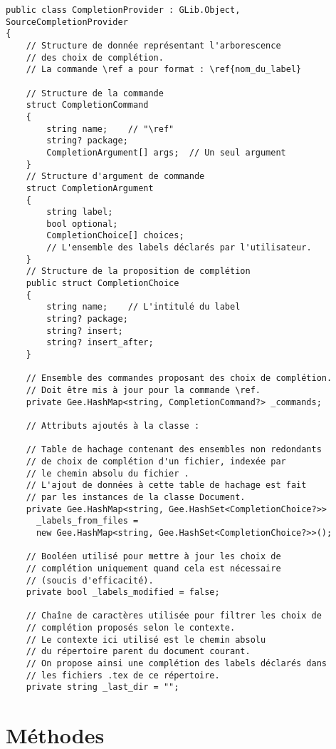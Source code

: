\documentclass[a4paper,11pt]{report}
\begin{document}
\begin{lstlisting}[frame=single]
public class CompletionProvider : GLib.Object, SourceCompletionProvider
{
    // Structure de donnée représentant l'arborescence
    // des choix de complétion.
    // La commande \ref a pour format : \ref{nom_du_label}
    
    // Structure de la commande
    struct CompletionCommand
    {
        string name;    // "\ref"
        string? package;
        CompletionArgument[] args;  // Un seul argument
    }
    // Structure d'argument de commande
    struct CompletionArgument
    {
        string label;
        bool optional;
        CompletionChoice[] choices;
        // L'ensemble des labels déclarés par l'utilisateur.
    }
    // Structure de la proposition de complétion
    public struct CompletionChoice
    {
        string name;    // L'intitulé du label
        string? package;
        string? insert;
        string? insert_after;
    }
    
    // Ensemble des commandes proposant des choix de complétion.
    // Doit être mis à jour pour la commande \ref.
    private Gee.HashMap<string, CompletionCommand?> _commands;
    
    // Attributs ajoutés à la classe :
    
    // Table de hachage contenant des ensembles non redondants
    // de choix de complétion d'un fichier, indexée par
    // le chemin absolu du fichier .
    // L'ajout de données à cette table de hachage est fait
    // par les instances de la classe Document.
    private Gee.HashMap<string, Gee.HashSet<CompletionChoice?>> 
      _labels_from_files =
      new Gee.HashMap<string, Gee.HashSet<CompletionChoice?>>();
    
    // Booléen utilisé pour mettre à jour les choix de
    // complétion uniquement quand cela est nécessaire
    // (soucis d'efficacité).
    private bool _labels_modified = false;
    
    // Chaîne de caractères utilisée pour filtrer les choix de
    // complétion proposés selon le contexte.
    // Le contexte ici utilisé est le chemin absolu
    // du répertoire parent du document courant.
    // On propose ainsi une complétion des labels déclarés dans
    // les fichiers .tex de ce répertoire.
    private string _last_dir = "";
\end{lstlisting}

\section{Méthodes}
\label{sec:CP_méthodes}
\end{document}
